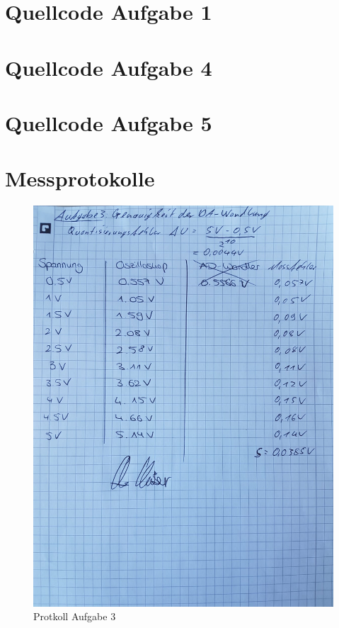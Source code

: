 \documentclass[12pt, oneside, a4paper, \docLanguage]{report}
\begin{document}
\section{Quellcode Aufgabe 1}
\label{chap:APPENDIX_SOURCECODE}


\newpage

\section{Quellcode Aufgabe 4}
\label{chap:APPENDIX_SOURCECODE}



\newpage

\section{Quellcode Aufgabe 5}
\label{chap:APPENDIX_SOURCECODE}



\section{Messprotokolle}
\label{chap:APPENDIX_SOURCECODE}

\begin{figure}[H]
	\centering\small
	\graphicspath{ {../versuch5/} }
	\includegraphics[width=.65\textwidth]{media/protokoll1}
	\caption{Protkoll Aufgabe 3}
	\label{fig:PROTOKOLL3}
\end{figure}
\end{document}
